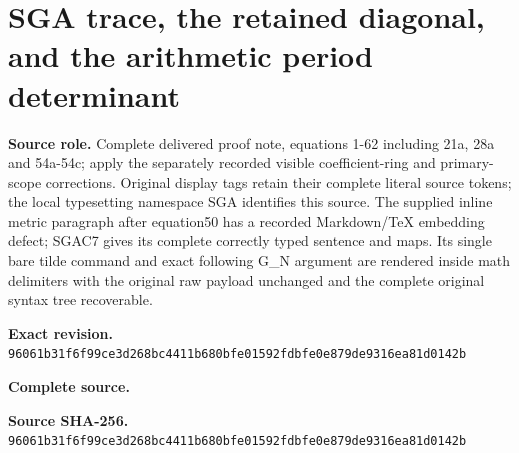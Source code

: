\begingroup
\sloppy
\small
\makeatletter
\let\EndpointOriginalTagForm\tagform@
\def\tagform@#1{\EndpointOriginalTagForm{SGA\, #1}}
\makeatother
\clearpage
\section{SGA trace, the retained diagonal, and the arithmetic period determinant}
\noindent\textbf{Source role.} Complete delivered proof note, equations 1-62 including 21a, 28a and 54a-54c; apply the separately recorded visible coefficient-ring and primary-scope corrections. Original display tags retain their complete literal source tokens; the local typesetting namespace SGA identifies this source. The supplied inline metric paragraph after equation50 has a recorded Markdown/TeX embedding defect; SGAC7 gives its complete correctly typed sentence and maps. Its single bare tilde command and exact following G\_N argument are rendered inside math delimiters with the original raw payload unchanged and the complete original syntax tree recoverable.\par
\noindent\textbf{Exact revision.} \nolinkurl{96061b31f6f99ce3d268bc4411b680bfe01592fdbfe0e879de9316ea81d0142b}\par
\noindent\textbf{Complete source.} \par
\noindent\textbf{Source SHA-256.} \nolinkurl{96061b31f6f99ce3d268bc4411b680bfe01592fdbfe0e879de9316ea81d0142b}\par\medskip

\endgroup
